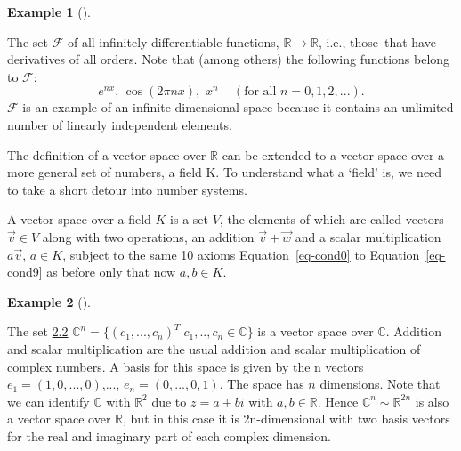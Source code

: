 \documentclass[
  a4paper,
  DIV=11,
  numbers=noendperiod,
  oneside]{scrreprt}
\theoremstyle{definition}
\newtheorem{example}{Example}[chapter]
\theoremstyle{remark}
\newenvironment{fbxSimple}[3]{\begin{tcolorbox}[enhanced, breakable,%
attach boxed title to top*={xshift=1.4pt},
boxed title style={boxrule=0.0mm, fuzzy shadow={1pt}{-1pt}{0mm}{0.1mm}{gray}, arc=.3em, rounded corners=east, sharp corners=west}, colframe=#1-color2, colbacktitle=#1-color1, colback = white, coltitle=black,  titlerule=0mm, toprule=0pt, bottomrule=.7pt, leftrule=.3em, rightrule=.7pt, outer arc=.3em,  	left=.5em, right=.5em, bottomtitle=1mm, toptitle=1mm,title=\textbf{#2}\hspace{0.5em}{#3}]}
{\end{tcolorbox}}
\begin{document}
\begin{tcolorbox}[enhanced jigsaw, titlerule=0mm, opacityback=0, coltitle=black, opacitybacktitle=0.6, colframe=quarto-callout-note-color-frame, colback=white, leftrule=.75mm, colbacktitle=quarto-callout-note-color!10!white, toprule=.15mm, bottomtitle=1mm, breakable, toptitle=1mm, rightrule=.15mm, title=\textcolor{quarto-callout-note-color}{\faInfo}\hspace{0.5em}{Advanced material}, left=2mm, bottomrule=.15mm, arc=.35mm]

\begin{example}[]\protect\hypertarget{exm-vktspace8}{}\label{exm-vktspace8}

The set \(\mathcal{F}\) of all infinitely differentiable functions,
\(\mathbb{R} \rightarrow \mathbb{R}\), i.e., those~that have derivatives
of all orders. Note that (among others) the following functions belong
to \(\mathcal{F}\): \[e^{nx},\,\cos \left( 2\pi nx\right)
,\,\,x^{n}\quad \,(\text{for all }n=0,1,2,...).\] \(\mathcal{F}\) is an
example of an infinite-dimensional space because it contains an
unlimited number of linearly independent elements.

\end{example}

The definition of a vector space over \(\mathbb{R}\) can be extended to
a vector space over a more general set of numbers, a field K. To
understand what a `field' is, we need to take a short detour into number
systems.

\label{vksoverk}
\begin{fbxSimple}{Definition}{Definition: }{Vector Space over K}
\label{vksoverk}
A vector space over a field \(K\) is a set \(V\), the elements of which
are called vectors \(\vec{v} \in V\) along with two operations, an
addition \(\vec{v} + \vec{w}\) and a scalar multiplication
\(a \vec{v}\), \(a \in K\), subject to the same 10 axioms
Equation~\ref{eq-cond0} to Equation~\ref{eq-cond9} as before only that
now \(a,b\in K\).

\end{fbxSimple}

\begin{example}[]\protect\hypertarget{exm-vktspace9}{}\label{exm-vktspace9}

The set \hyperref[vksoverk]{2.2}
\(\mathbb{C}^{n} =\{ (c_{1},...,c_{n})^{T}| c_{1},..,c_{n}\in \mathbb{C}\}\)
is a vector space over \(\mathbb{C}\). Addition and scalar
multiplication are the usual addition and scalar multiplication of
complex numbers. A basis for this space is given by the n vectors
\(e_{1}=(1,0,...,0)\),..., \(e_{n}=(0,...,0,1)\). The space has \(n\)
dimensions. Note that we can identify \(\mathbb{C}\) with
\(\mathbb{R}^{2}\) due to \(z= a + b i\) with \(a,b \in \mathbb{R}\).
Hence \(\mathbb{C}^{n}  \sim \mathbb{R}^{2n}\) is also a vector space
over \(\mathbb{R}\), but in this case it is 2n-dimensional with two
basis vectors for the real and imaginary part of each complex dimension.

\end{example}

\end{tcolorbox}
\end{document}

